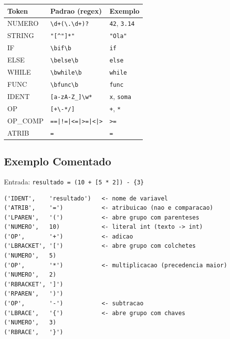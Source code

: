 \documentclass[12pt, a4paper]{article}
\begin{document}
\begin{center}
{\small
\begin{tabular}{lll}
\toprule
\textbf{Token} & \textbf{Padrao (regex)} & \textbf{Exemplo} \\
\midrule
NUMERO   & \texttt{\textbackslash d+(\textbackslash.\textbackslash d+)?} & \texttt{42}, \texttt{3.14} \\
STRING   & \texttt{"[\^{}"]*"}         & \texttt{"Ola"} \\
IF       & \texttt{\textbackslash bif\textbackslash b}    & \texttt{if} \\
ELSE     & \texttt{\textbackslash belse\textbackslash b}  & \texttt{else} \\
WHILE    & \texttt{\textbackslash bwhile\textbackslash b} & \texttt{while} \\
FUNC     & \texttt{\textbackslash bfunc\textbackslash b}  & \texttt{func} \\
IDENT    & \texttt{[a-zA-Z\_]\textbackslash w*} & \texttt{x}, \texttt{soma} \\
OP       & \texttt{[+\textbackslash-*/]}        & \texttt{+}, \texttt{*} \\
OP\_COMP & \texttt{==|!=|<=|>=|<|>}    & \texttt{>=} \\
ATRIB    & \texttt{=}                  & \texttt{=} \\
\bottomrule
\end{tabular}
}
\end{center}

\subsection{Exemplo Comentado}

Entrada: \verb|resultado = (10 + [5 * 2]) - {3}|

\begin{lstlisting}[caption={Tokens gerados pelo lexer}]
('IDENT',    'resultado')   <- nome de variavel
('ATRIB',    '=')           <- atribuicao (nao e comparacao)
('LPAREN',   '(')           <- abre grupo com parenteses
('NUMERO',   10)            <- literal int (texto -> int)
('OP',       '+')           <- adicao
('LBRACKET', '[')           <- abre grupo com colchetes
('NUMERO',   5)
('OP',       '*')           <- multiplicacao (precedencia maior)
('NUMERO',   2)
('RBRACKET', ']')
('RPAREN',   ')')
('OP',       '-')           <- subtracao
('LBRACE',   '{')           <- abre grupo com chaves
('NUMERO',   3)
('RBRACE',   '}')
\end{lstlisting}
\end{document}
